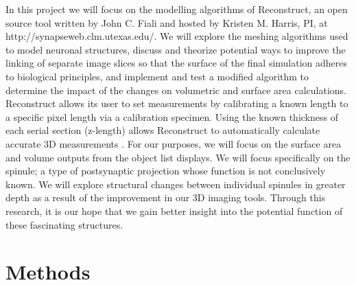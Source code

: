 \documentclass{article}
\begin{document}
In this project we will focus on the modelling algorithms of Reconstruct, an open source tool written by John C. Fiali and hosted by Kristen M. Harris, PI, at http://synapseweb.clm.utexas.edu/.  We will explore the meshing algorithms used to model neuronal structures, discuss and theorize potential ways to improve the linking of separate image slices so that the surface of the final simulation adheres to biological principles, and implement and test a modified algorithm to determine the impact of the changes on volumetric and surface area calculations. Reconstruct allows its user to set measurements by calibrating a known length to a specific pixel length via a calibration specimen. Using the known thickness of each serial section (z-length) allows Reconstruct to automatically calculate accurate 3D measurements \cite{fiala2005reconstruct}. For our purposes, we will focus on the surface area and volume outputs from the object list displays. We will focus specifically on the spinule; a type of postsynaptic projection whose function is not conclusively known. We will explore structural changes between individual spinules in greater depth as a result of the improvement in our 3D imaging tools. Through this research, it is our hope that we gain better insight into the potential function of these fascinating structures.

\section{Methods}
\end{document}
